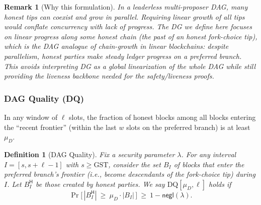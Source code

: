 \documentclass[11pt]{article}
\newtheorem{definition}[theorem]{Definition}
\newtheorem{remark}[theorem]{Remark}
\newcommand{\negl}{\ensuremath{\mathsf{negl}}\xspace}
\begin{document}
\begin{remark}[Why this formulation]
In a leaderless multi-proposer DAG, many honest tips can coexist and grow in parallel.
Requiring linear growth of \emph{all} tips would conflate concurrency with lack of progress.
The DG we define here focuses on \emph{linear progress along some honest chain} (the past of an honest fork-choice tip), which is the DAG analogue of chain-growth in linear blockchains: despite parallelism, honest parties make steady ledger progress on a preferred branch.
This avoids interpreting DG as a global linearization of the whole DAG while still providing the liveness backbone needed for the safety/liveness proofs.
\end{remark}





\subsubsection{DAG Quality (DQ)} 
\label{sec:DQ}

In any window of $\ell$ slots, the fraction of honest blocks among all blocks entering the “recent frontier” (within the last $w$ slots on the preferred branch) is at least $\mu_D$.



\begin{definition}[DAG Quality]\label{def:DQ}
Fix a security parameter $\lambda$. For any interval $I=[s,s+\ell-1]$ with $s\ge \mathrm{GST}$, consider the set $B_I$ of blocks that enter the preferred branch's frontier (i.e., become descendants of the fork-choice tip) during $I$. Let $B_I^{\mathsf{H}}$ be those created by honest parties.
We say $\mathrm{DQ}[\mu_D,\ell]$ holds if
\begin{equation*}
\Pr\big[\,|B_I^{\mathsf{H}}|\ \ge\ \mu_D \cdot |B_I|\,\big]\ \ge\ 1-\negl(\lambda).
\end{equation*}
\end{definition}
\end{document}
